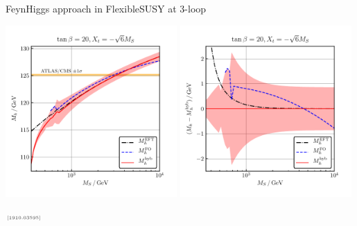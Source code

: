 \documentclass[hyperref={pdfpagelabels=false},ngerman]{beamer}
\newcommand{\mycite}[1]{\ensuremath{\text{\textcolor{darkgray}{\tiny [#1]}}}}
\begin{document}
\begin{frame}{FeynHiggs approach in FlexibleSUSY at 3-loop}
  \begin{center}
    \includegraphics[width=0.49\textwidth]{plots/Mh3l-match-really/scan_Mh_MS_TB-20_Xt--sqrt6_mixed_3L}\hfill
    \includegraphics[width=0.49\textwidth]{plots/Mh3l-match-really/scan_Mh_MS_TB-20_Xt--sqrt6_mixed_3L_diff}
  \end{center}
  \mycite{1910.03595}
\end{frame}
\end{document}
